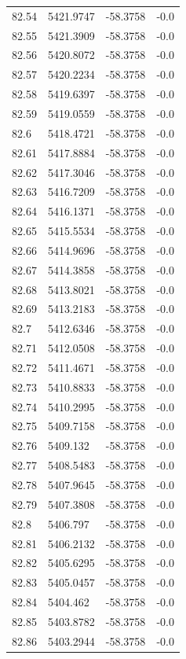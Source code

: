\begin{table}[H]
\begin{tabular}{llll}
82.54 & 5421.9747 & -58.3758 & -0.0 \\
82.55 & 5421.3909 & -58.3758 & -0.0 \\
82.56 & 5420.8072 & -58.3758 & -0.0 \\
82.57 & 5420.2234 & -58.3758 & -0.0 \\
82.58 & 5419.6397 & -58.3758 & -0.0 \\
82.59 & 5419.0559 & -58.3758 & -0.0 \\
82.6 & 5418.4721 & -58.3758 & -0.0 \\
82.61 & 5417.8884 & -58.3758 & -0.0 \\
82.62 & 5417.3046 & -58.3758 & -0.0 \\
82.63 & 5416.7209 & -58.3758 & -0.0 \\
82.64 & 5416.1371 & -58.3758 & -0.0 \\
82.65 & 5415.5534 & -58.3758 & -0.0 \\
82.66 & 5414.9696 & -58.3758 & -0.0 \\
82.67 & 5414.3858 & -58.3758 & -0.0 \\
82.68 & 5413.8021 & -58.3758 & -0.0 \\
82.69 & 5413.2183 & -58.3758 & -0.0 \\
82.7 & 5412.6346 & -58.3758 & -0.0 \\
82.71 & 5412.0508 & -58.3758 & -0.0 \\
82.72 & 5411.4671 & -58.3758 & -0.0 \\
82.73 & 5410.8833 & -58.3758 & -0.0 \\
82.74 & 5410.2995 & -58.3758 & -0.0 \\
82.75 & 5409.7158 & -58.3758 & -0.0 \\
82.76 & 5409.132 & -58.3758 & -0.0 \\
82.77 & 5408.5483 & -58.3758 & -0.0 \\
82.78 & 5407.9645 & -58.3758 & -0.0 \\
82.79 & 5407.3808 & -58.3758 & -0.0 \\
82.8 & 5406.797 & -58.3758 & -0.0 \\
82.81 & 5406.2132 & -58.3758 & -0.0 \\
82.82 & 5405.6295 & -58.3758 & -0.0 \\
82.83 & 5405.0457 & -58.3758 & -0.0 \\
82.84 & 5404.462 & -58.3758 & -0.0 \\
82.85 & 5403.8782 & -58.3758 & -0.0 \\
82.86 & 5403.2944 & -58.3758 & -0.0 \\

\end{tabular}
\end{table}
